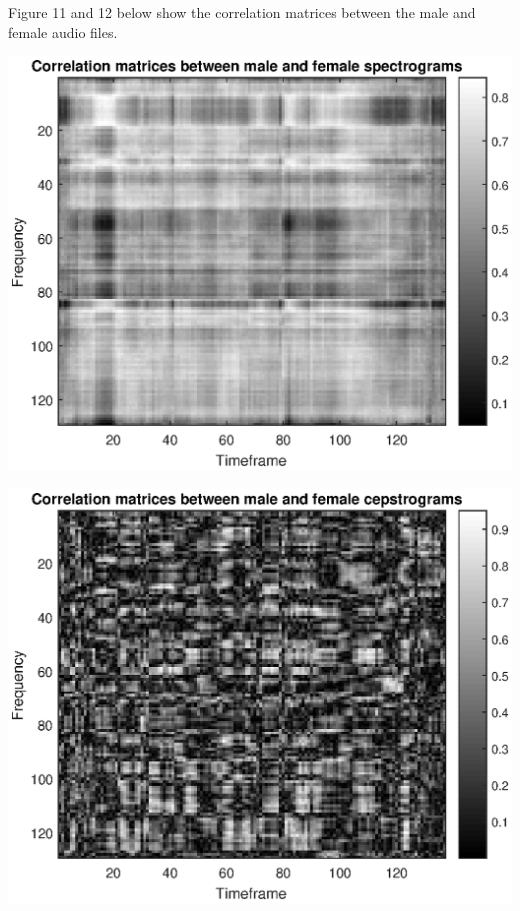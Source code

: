 \documentclass[]{article}
\let\origfigure\figure
\let\endorigfigure\endfigure
\renewenvironment{figure}[1][2] {
    \expandafter\origfigure\expandafter[H]
} {
    \endorigfigure
}
\begin{document}
Figure 11 and 12 below show the correlation matrices between the male
and female audio files.

\begin{figure}
\centering
\includegraphics{Result_Pics/corr_female_male_spetgram.eps}
\caption{Correlation between male and female spectrograms}
\end{figure}

\begin{figure}
\centering
\includegraphics{Result_Pics/corr_female_male_cepgram.eps}
\caption{Correlation between male and female cepstrograms}
\end{figure}
\end{document}
